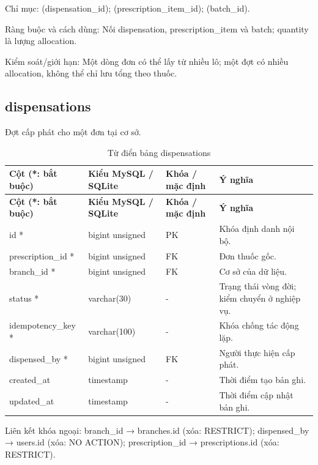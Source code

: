 Chỉ mục:\allowbreak{} (dispensation\_\allowbreak{}id); (prescription\_\allowbreak{}item\_\allowbreak{}id); (batch\_\allowbreak{}id).\allowbreak{}

Ràng buộc và cách dùng:\allowbreak{} Nối dispensation, prescription\_\allowbreak{}item và batch; quantity là lượng allocation.\allowbreak{}

Kiểm soát/\allowbreak{}giới hạn:\allowbreak{} Một dòng đơn có thể lấy từ nhiều lô; một đợt có nhiều allocation, không thể chỉ lưu tổng theo thuốc.\allowbreak{}

\clearpage

\subsection{dispensations}
Đợt cấp phát cho một đơn tại cơ sở.\allowbreak{}


{\fontsize{10}{12}\selectfont\setlength{\tabcolsep}{3pt}\renewcommand{\arraystretch}{1.12}
\begin{longtable}{@{}L{\textwidth-4.86pt\relax} L{\textwidth-3.96pt\relax} L{\textwidth-2.88pt\relax} L{\textwidth-6.3pt\relax}@{}}
\caption{Từ điển bảng dispensations}\\
\toprule
\textbf{Cột (*:\allowbreak{} bắt buộc)} & \textbf{Kiểu My\allowbreak{}SQL /\allowbreak{} SQLite} & \textbf{Khóa /\allowbreak{} mặc định} & \textbf{Ý nghĩa}\\\midrule
\endfirsthead
\toprule
\textbf{Cột (*:\allowbreak{} bắt buộc)} & \textbf{Kiểu My\allowbreak{}SQL /\allowbreak{} SQLite} & \textbf{Khóa /\allowbreak{} mặc định} & \textbf{Ý nghĩa}\\\midrule
\endhead
\bottomrule\endlastfoot
id * & bigint unsigned & PK & Khóa định danh nội bộ.\allowbreak{}\\[1pt]
prescription\_\allowbreak{}id * & bigint unsigned & FK & Đơn thuốc gốc.\allowbreak{}\\[1pt]
branch\_\allowbreak{}id * & bigint unsigned & FK & Cơ sở của dữ liệu.\allowbreak{}\\[1pt]
status * & varchar(30) & - & Trạng thái vòng đời; kiểm chuyển ở nghiệp vụ.\allowbreak{}\\[1pt]
idempotency\_\allowbreak{}key * & varchar(100) & - & Khóa chống tác động lặp.\allowbreak{}\\[1pt]
dispensed\_\allowbreak{}by * & bigint unsigned & FK & Người thực hiện cấp phát.\allowbreak{}\\[1pt]
created\_\allowbreak{}at & timestamp & - & Thời điểm tạo bản ghi.\allowbreak{}\\[1pt]
updated\_\allowbreak{}at & timestamp & - & Thời điểm cập nhật bản ghi.\allowbreak{}\\[1pt]
\end{longtable}}
Liên kết khóa ngoại:\allowbreak{} branch\_\allowbreak{}id → branches.\allowbreak{}id (xóa:\allowbreak{} RESTRICT); dispensed\_\allowbreak{}by → users.\allowbreak{}id (xóa:\allowbreak{} NO ACTION); prescription\_\allowbreak{}id → prescriptions.\allowbreak{}id (xóa:\allowbreak{} RESTRICT).\allowbreak{}

